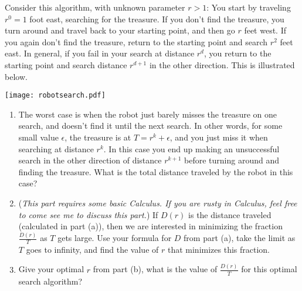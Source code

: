 \documentclass[11pt]{article}
\begin{document}
\begin{enumerate}
  Consider this algorithm, with unknown parameter $r>1$: You start by
  traveling $r^0=1$ foot east, searching for the treasure. If you don't
  find the treasure, you turn around and travel back to your starting
  point, and then go $r$ feet west. If you again don't find the treasure,
  return to the starting point and search $r^2$ feet east. In
  general, if you fail in your search at distance $r^d$, you return to
  the starting point and search distance $r^{d+1}$ in the other
  direction. This is illustrated below.
  \begin{center}
    \texttt{[image: robotsearch.pdf]}
  \end{center}
  \begin{enumerate}
    \item The worst case is when the robot just barely misses the
      treasure on one search, and doesn't find it until the next
      search. In other words, for some small value $\epsilon$, the
      treasure is at $T=r^k+\epsilon$, and you just miss it when
      searching at distance $r^{k}$. In this case you end up making an
      unsuccessful search in the other direction of distance $r^{k+1}$
      before turning around and finding the treasure. What is the
      total distance traveled by the robot in this case?
    \item (\textsl{This part requires some basic Calculus. If you are
      rusty in Calculus, feel free to come see me to discuss this
      part.}) If $D(r)$ is the distance traveled (calculated in part
      (a)), then we are interested in minimizing the fraction
      $\frac{D(r)}{T}$ as $T$ gets large. Use your formula for $D$ from
      part (a), take the limit as $T$ goes to infinity, and find the
      value of $r$ that minimizes this fraction.
    \item Give your optimal $r$ from part (b), what is the value of
      $\frac{D(r)}{T}$ for this optimal search algorithm?
  \end{enumerate}

\end{enumerate}
\end{document}
